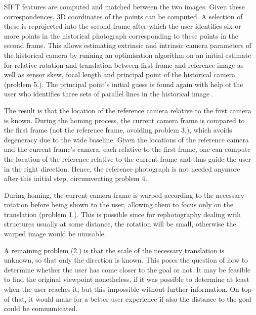 SIFT features \citep{lowe2004} are computed and matched between the two images.
Given these correspondences, 3D coordinates of the points can be computed. A
selection of these is reprojected into the second frame after which the user
identifies six or more points in the historical photograph corresponding to
these points in the second frame. This allows estimating extrinsic and
intrinsic camera parameters of the historical camera by running an optimisation
algorithm on an initial estimate for relative rotation and translation between
first frame and reference image as well as sensor skew, focal length and
principal point of the historical camera (problem 5.).  The principal point's initial guess
is found again with help of the user who identifies three sets of parallel lines
in the historical image \citep[see][chapter 8.8]{h&z2004}.

The result is that the location of the reference camera relative to the first
camera is known. During the homing process, the current camera frame is compared
to the first frame (not the reference frame, avoiding problem 3.), which avoids
degeneracy due to the wide baseline. Given the locations of the reference camera
and the current frame's camera, each relative to the first frame, one can
compute the location of the reference relative to the current frame and thus
guide the user in the right direction. Hence, the reference photograph is not
needed anymore after this initial step, circumventing problem 4.

During homing, the current camera frame is warped according to the necessary
rotation before being shown to the user, allowing them to focus only on the
translation (problem 1.). This is possible since for rephotography
dealing with structures usually at some distance, the rotation will be small,
otherwise the warped image would be unusable.

A remaining problem (2.) is that the scale of the necessary translation is unknown,
so that only the direction is known. This poses the question of how to determine
whether the user has come closer to the goal or not. It may be feasible to find
the original viewpoint nonetheless, if it was possible to determine at least
when the user reaches it, but this impossible without further information. On
top of that, it would make for a better user experience if also the distance to
the goal could be communicated.

